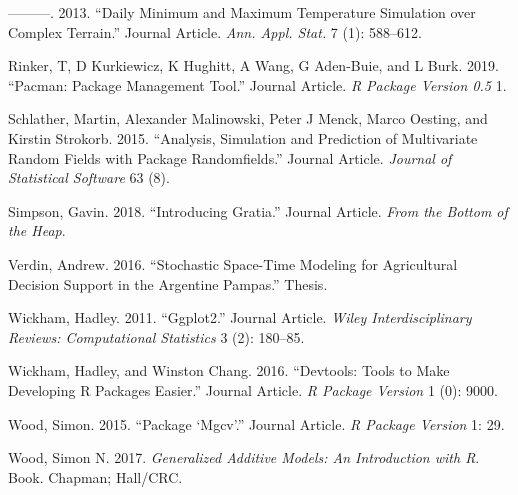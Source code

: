 \documentclass[
  12pt]{article}
\begin{document}
\leavevmode\hypertarget{ref-RN3538}{}%
---------. 2013. ``Daily Minimum and Maximum Temperature Simulation over Complex Terrain.'' Journal Article. \emph{Ann. Appl. Stat.} 7 (1): 588--612.

\leavevmode\hypertarget{ref-RN5394}{}%
Rinker, T, D Kurkiewicz, K Hughitt, A Wang, G Aden-Buie, and L Burk. 2019. ``Pacman: Package Management Tool.'' Journal Article. \emph{R Package Version 0.5} 1.

\leavevmode\hypertarget{ref-RN4406}{}%
Schlather, Martin, Alexander Malinowski, Peter J Menck, Marco Oesting, and Kirstin Strokorb. 2015. ``Analysis, Simulation and Prediction of Multivariate Random Fields with Package Randomfields.'' Journal Article. \emph{Journal of Statistical Software} 63 (8).

\leavevmode\hypertarget{ref-RN5389}{}%
Simpson, Gavin. 2018. ``Introducing Gratia.'' Journal Article. \emph{From the Bottom of the Heap}.

\leavevmode\hypertarget{ref-RN3540}{}%
Verdin, Andrew. 2016. ``Stochastic Space-Time Modeling for Agricultural Decision Support in the Argentine Pampas.'' Thesis.

\leavevmode\hypertarget{ref-RN5391}{}%
Wickham, Hadley. 2011. ``Ggplot2.'' Journal Article. \emph{Wiley Interdisciplinary Reviews: Computational Statistics} 3 (2): 180--85.

\leavevmode\hypertarget{ref-RN5395}{}%
Wickham, Hadley, and Winston Chang. 2016. ``Devtools: Tools to Make Developing R Packages Easier.'' Journal Article. \emph{R Package Version} 1 (0): 9000.

\leavevmode\hypertarget{ref-RN5393}{}%
Wood, Simon. 2015. ``Package `Mgcv'.'' Journal Article. \emph{R Package Version} 1: 29.

\leavevmode\hypertarget{ref-RN3704}{}%
Wood, Simon N. 2017. \emph{Generalized Additive Models: An Introduction with R}. Book. Chapman; Hall/CRC.
\end{document}

